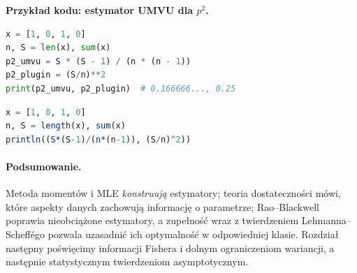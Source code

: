 \noindent\textbf{Przykład kodu: estymator UMVU dla $p^2$.}\par
\par
{}
\smallskip
\begin{lstlisting}[language=Python,caption={UMVU dla kwadratu prawdopodobieństwa sukcesu (Python).}]
x = [1, 0, 1, 0]
n, S = len(x), sum(x)
p2_umvu = S * (S - 1) / (n * (n - 1))
p2_plugin = (S/n)**2
print(p2_umvu, p2_plugin)  # 0.166666..., 0.25
\end{lstlisting}
\par
{}
\smallskip
\begin{lstlisting}[language=Julia,caption={UMVU dla kwadratu prawdopodobieństwa sukcesu (Julia).}]
x = [1, 0, 1, 0]
n, S = length(x), sum(x)
println((S*(S-1)/(n*(n-1)), (S/n)^2))
\end{lstlisting}

\paragraph{Podsumowanie.}
Metoda momentów i MLE \emph{konstruują} estymatory; teoria
dostateczności mówi, które aspekty danych zachowują informację
o parametrze; Rao--Blackwell poprawia nieobciążone estymatory,
a zupełność wraz z twierdzeniem Lehmanna--Scheffégo pozwala
uzasadnić ich optymalność w odpowiedniej klasie. Rozdział następny
poświęcimy informacji Fishera i dolnym ograniczeniom wariancji,
a następnie statystycznym twierdzeniom asymptotycznym.


